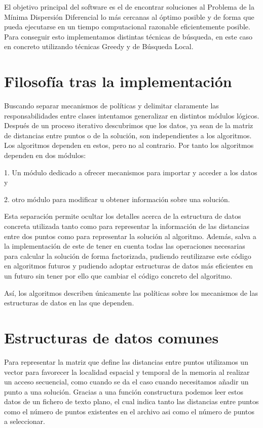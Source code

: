 El objetivo principal del software es el de encontrar soluciones al Problema de la Mínima Dispersión Diferencial lo más cercanas
al óptimo posible y de forma que pueda ejecutarse en un tiempo computacional razonable eficientemente posible. Para conseguir esto
implementamos distintas técnicas de búsqueda, en este caso en concreto utilizando técnicas Greedy y de Búsqueda Local.

\section{Filosofía tras la implementación}

Buscando separar mecanismos de políticas y delimitar claramente las responsabilidades entre clases intentamos generalizar en
distintos módulos lógicos. Después de un proceso iterativo descubrimos que los datos, ya sean de la matriz de distancias
entre puntos o de la solución, son independientes a los algoritmos.
Los algoritmos dependen en estos, pero no al contrario. Por tanto los algoritmos dependen en dos módulos:

    1. Un módulo dedicado a ofrecer mecanismos para importar y acceder a los datos y
    
    2. otro módulo para modificar u obtener información sobre una solución.

Esta separación permite ocultar los detalles acerca de la estructura de datos concreta utilizada tanto como para representar
la información de las distancias entre dos puntos como para representar
la solución al algoritmo. Además, salva a la implementación de este de tener en cuenta todas las operaciones necesarias
para calcular la solución de forma factorizada, pudiendo reutilizarse este código en algoritmos futuros y pudiendo adoptar estructuras
de datos más eficientes en un futuro sin tener por ello que cambiar el código concreto del algoritmo.

Así, los algoritmos describen únicamente las políticas sobre los mecanismos de las estructuras de datos en las que dependen.

\section{Estructuras de datos comunes}

Para representar la matriz que define las distancias entre puntos utilizamos un vector para favorecer la localidad espacial y temporal de la memoria al realizar un acceso secuencial, como cuando se da el caso cuando necesitamos añadir un punto a una solución. Gracias a una función constructura
podemos leer estos datos de un fichero de texto plano, el cual indica tanto las distancias entre puntos como el número de puntos existentes en el
archivo asi como el número de puntos a seleccionar.

